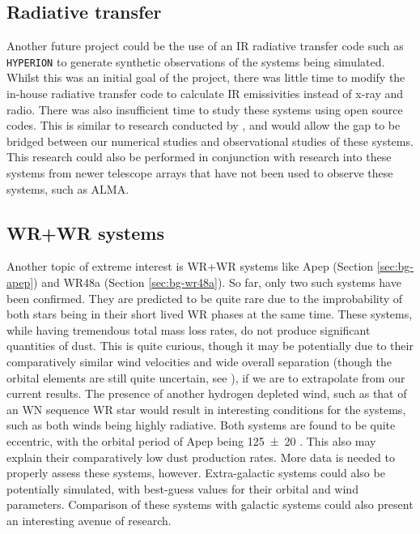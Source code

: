 \subsection{Radiative transfer}

Another future project could be the use of an IR radiative transfer code such as \texttt{HYPERION} \parencite{robitailleHYPERIONOpensourceParallelized2011} to generate synthetic observations of the systems being simulated.
Whilst this was an initial goal of the project, there was little time to modify the in-house radiative transfer code to calculate IR emissivities instead of x-ray and radio.
There was also insufficient time to study these systems using open source codes.
This is similar to research conducted by \textcite{hendrix_pinwheels_2016}, and would allow the gap to be bridged between our numerical studies and observational studies of these systems.
This research could also be performed in conjunction with research into these systems from newer telescope arrays that have not been used to observe these systems, such as ALMA.

\subsection{WR+WR systems}

Another topic of extreme interest is WR+WR systems like Apep (Section \ref{sec:bg-apep}) and WR48a (Section \ref{sec:bg-wr48a}).
So far, only two such systems have been confirmed.
They are predicted to be quite rare due to the improbability of both stars being in their short lived WR phases at the same time.
These systems, while having tremendous total mass loss rates, do not produce significant quantities of dust.
This is quite curious, though it may be potentially due to their comparatively similar wind velocities and wide overall separation (though the orbital elements are still quite uncertain, see \cite{hanExtremeCollidingwindSystem2020}), if we are to extrapolate from our current results.
The presence of another hydrogen depleted wind, such as that of an WN sequence WR star would result in interesting conditions for the systems, such as both winds being highly radiative.
Both systems are found to be quite eccentric, with the orbital period of Apep being \SI{125(20)}{\year} \parencite{hanExtremeCollidingwindSystem2020}.
This also may explain their comparatively low dust production rates.
More data is needed to properly assess these systems, however.
Extra-galactic systems could also be potentially simulated, with best-guess values for their orbital and wind parameters.
Comparison of these systems with galactic systems could also present an interesting avenue of research.

